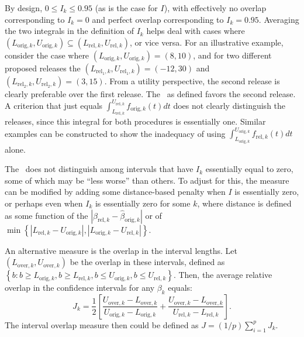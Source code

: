 \documentclass[12pt]{article}
\begin{document}
By design, $0 \leq I_k \leq 0.95$ (as is the case for $I$), with
effectively no overlap corresponding to $I_k =0$ and perfect
overlap corresponding to $I_k = 0.95$.  Averaging the two
integrals in the definition of $I_k$ helps deal with cases where
$(L_{\mathrm{orig},k}, U_{\mathrm{orig},k}) \subseteq
(L_{\mathrm{rel},k}, U_{\mathrm{rel},k})$, or vice versa.  For an
illustrative example, consider the case where
$(L_{\mathrm{orig},k}, U_{\mathrm{orig},k}) = (8, 10)$, and for
two different proposed releases the $(L_{\mathrm{rel_1},k},
U_{\mathrm{rel_1},k})=(-12, 30)$ and $(L_{\mathrm{rel_2},k},
U_{\mathrm{rel_2},k})=(3, 15)$. From a utility perspective, the
second release is clearly preferable over the first release. The
\IO\ as defined favors the second release.  A criterion that just
equals $\int_{L_{\mathrm{rel},k}}^{U_{\mathrm{rel},k}}
f_{\mathrm{orig},k}(t) dt$ does not clearly distinguish the
releases, since this integral for both procedures is essentially
one. Similar examples can be constructed to show the inadequacy of
using $\int_{L_{\mathrm{orig},k}}^{U_{\mathrm{orig},k}}
f_{\mathrm{rel},k}(t) dt$ alone.

The \IO\ does not distinguish among intervals that have $I_k$
essentially equal to zero, some of which may be ``less worse''
than others. To adjust for this, the measure can be modified by
adding some distance-based penalty when $I$ is essentially zero,
or perhaps even when $I_k$ is essentially zero for some $k$, where
distance is defined as some function of the
$|\hat{\beta}_{\mathrm{rel},k} - \hat{\beta}_{\mathrm{orig},k}|$
or of $\min\left\{|L_{\mathrm{rel},k} - U_{\mathrm{orig},k}|,
|L_{\mathrm{orig},k} - U_{\mathrm{rel},k}|\right\}$.

An alternative measure is the overlap in the interval lengths. Let
$(L_{\mathrm{over},k}, U_{\mathrm{over},k})$ be the overlap in
these intervals, defined as $\left\{b: b \geq L_{\mathrm{orig},k},
b \geq L_{\mathrm{rel},k},  b \leq U_{\mathrm{orig},k},  b \leq
U_{\mathrm{rel},k}\right\}$. Then, the average relative overlap in
the confidence intervals for any $\beta_{k}$ equals:
\begin{equation}
J_k = \frac{1}{2} \left[\frac{U_{\mathrm{over},k} -
L_{\mathrm{over},k}}{U_{\mathrm{orig},k} - L_{\mathrm{orig},k}} +
\frac{U_{\mathrm{over},k} -
L_{\mathrm{over},k}}{U_{\mathrm{rel},k} -
L_{\mathrm{rel},k}}\right].
\end{equation}
The interval overlap measure then could be defined as $J = (1/p)
\sum_{i=1}^p J_k$.
\end{document}
